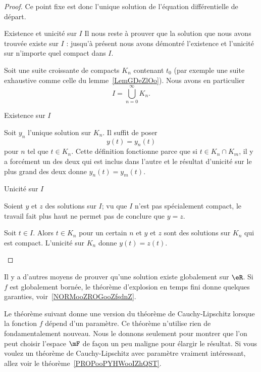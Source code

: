 \begin{proof}
    Ce point fixe est donc l'unique solution de l'équation différentielle de départ.

    \begin{subproof}
        \item[Existence et unicité sur \( I\)]
            Il nous reste à prouver que la solution que nous avons trouvée existe sur \( I\) : jusqu'à présent nous avons démontré l'existence et l'unicité sur n'importe quel compact dans \( I\).

            Soit une suite croissante de compacts \( K_n\) contenant \( t_0\) (par exemple une suite exhaustive comme celle du lemme~\ref{LemGDeZlOo}). Nous avons en particulier
            \begin{equation}
                I=\bigcup_{n=0}^{\infty}K_n.
            \end{equation}
        \item[Existence sur \( I\)]

            Soit \( y_n\) l'unique solution sur \( K_n\). Il suffit de poser
            \begin{equation}
                y(t)=y_n(t)
            \end{equation}
            pour \( n\) tel que \( t\in K_n\). Cette définition fonctionne parce que si \( t\in K_n\cap K_m\), il y a forcément un des deux qui est inclus dans l'autre et le résultat d'unicité sur le plus grand des deux donne \( y_n(t)=y_m(t)\).

        \item[Unicité sur \( I\)]

            Soient \( y\) et \(z \) des solutions sur \( I\); vu que \( I\) n'est pas spécialement compact, le travail fait plus haut ne permet pas de conclure que \( y=z\).

            Soit \( t\in I\). Alors \( t\in K_n\) pour un certain \( n\) et \( y\) et \( z\) sont des solutions sur \( K_n\) qui est compact. L'unicité sur \( K_n\) donne \( y(t)=z(t)\).
    \end{subproof}
\end{proof}

\begin{normaltext}
    Il y a d'autres moyens de prouver qu'une solution existe globalement sur \( \eR\). Si \( f\) est globalement bornée, le théorème d'explosion en temps fini donne quelques garanties, voir~\ref{NORMooZROGooZfsdnZ}.
\end{normaltext}

Le théorème suivant donne une version du théorème de Cauchy-Lipschitz lorsque la fonction \( f\) dépend d'un paramètre. Ce théorème n'utilise rien de fondamentalement nouveau. Nous le donnons seulement pour montrer que l'on peut choisir l'espace \( \mF\) de façon un peu maligne pour élargir le résultat. Si vous voulez un théorème de Cauchy-Lipschitz avec paramètre vraiment intéressant, allez voir le théorème~\ref{PROPooPYHWooIZhQST}.

